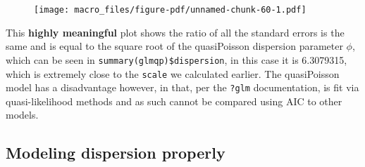 \documentclass[
  letterpaper,
  DIV=11,
  numbers=noendperiod]{scrreprt}
\newenvironment{Shaded}{\begin{snugshade}}{\end{snugshade}}
\newcommand{\AttributeTok}[1]{\textcolor[rgb]{0.40,0.45,0.13}{#1}}
\newcommand{\DecValTok}[1]{\textcolor[rgb]{0.68,0.00,0.00}{#1}}
\newcommand{\FunctionTok}[1]{\textcolor[rgb]{0.28,0.35,0.67}{#1}}
\newcommand{\NormalTok}[1]{\textcolor[rgb]{0.00,0.23,0.31}{#1}}
\newcommand{\OtherTok}[1]{\textcolor[rgb]{0.00,0.23,0.31}{#1}}
\newcommand{\SpecialCharTok}[1]{\textcolor[rgb]{0.37,0.37,0.37}{#1}}
\newcommand{\StringTok}[1]{\textcolor[rgb]{0.13,0.47,0.30}{#1}}
\begin{document}
\begin{Shaded}
\end{Shaded}

\begin{figure}[H]

{\centering \texttt{[image: macro\_files/figure-pdf/unnamed-chunk-60-1.pdf]}

}

\end{figure}

This \textbf{highly meaningful} plot shows the ratio of all the standard
errors is the same and is equal to the square root of the quasiPoisson
dispersion parameter \(\phi\), which can be seen in
\texttt{summary(glmqp)\$dispersion}, in this case it is 6.3079315, which
is extremely close to the \texttt{scale} we calculated earlier. The
quasiPoisson model has a disadvantage however, in that, per the
\texttt{?glm} documentation, is fit via quasi-likelihood methods and as
such cannot be compared using AIC to other models.

\hypertarget{modeling-dispersion-properly}{%
\subsection{Modeling dispersion
properly}\label{modeling-dispersion-properly}}
\end{document}
